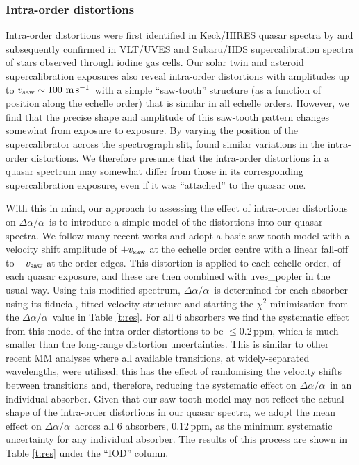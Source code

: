 \documentclass[fleqn,usenatbib,usedcolumn]{mnras}
\newcommand{\Tref}[1]{Table \ref{#1}}
\newcommand{\ms}{\ensuremath{\textrm{m\,s}^{-1}}}
\newcommand{\daa}{\ensuremath{\Delta\alpha/\alpha}}
\begin{document}
\subsubsection{Intra-order distortions}\label{sss:intra}

Intra-order distortions were first identified in Keck/HIRES quasar spectra by \citet{Griest:2010:158} and subsequently confirmed in VLT/UVES \citep{Whitmore:2010:89} and Subaru/HDS \citep{Evans:2014:128} supercalibration spectra of stars observed through iodine gas cells. Our solar twin and asteroid supercalibration exposures also reveal intra-order distortions with amplitudes up to $v_{\rm saw}\sim100$\,\ms\ with a simple ``saw-tooth'' structure (as a function of position along the echelle order) that is similar in all echelle orders. However, we find that the precise shape and amplitude of this saw-tooth pattern changes somewhat from exposure to exposure. By varying the position of the supercalibrator across the spectrograph slit, \citet{Whitmore:2015:446} found similar variations in the intra-order distortions. We therefore presume that the intra-order distortions in a quasar spectrum may somewhat differ from those in its corresponding supercalibration exposure, even if it was ``attached'' to the quasar one.

With this in mind, our approach to assessing the effect of intra-order distortions on \daa\ is to introduce a simple model of the distortions into our quasar spectra. We follow many recent works \citep[e.g.][]{Malec:2010:1541,Molaro:2013:A68,Bagdonaite:2014:10,Evans:2014:128,Murphy:2016:2461,Kotus:2017:3679} and adopt a basic saw-tooth model with a velocity shift amplitude of $+v_{\rm saw}$ at the echelle order centre with a linear fall-off to $-v_{\rm saw}$ at the order edges. This distortion is applied to each echelle order, of each quasar exposure, and these are then combined with {\sc uves\_popler} in the usual way. Using this modified spectrum, \daa\ is determined for each absorber using its fiducial, fitted velocity structure and starting the $\chi^2$ minimisation from the \daa\ value in \Tref{t:res}. For all 6 absorbers we find the systematic effect from this model of the intra-order distortions to be $\le0.2$\,ppm, which is much smaller than the long-range distortion uncertainties. This is similar to other recent MM analyses where all available transitions, at widely-separated wavelengths, were utilised; this has the effect of randomising the velocity shifts between transitions and, therefore, reducing the systematic effect on \daa\ in an individual absorber. Given that our saw-tooth model may not reflect the actual shape of the intra-order distortions in our quasar spectra, we adopt the mean effect on \daa\ across all 6 absorbers, 0.12\,ppm, as the minimum systematic uncertainty for any individual absorber. The results of this process are shown in \Tref{t:res} under the ``IOD'' column.
\end{document}
